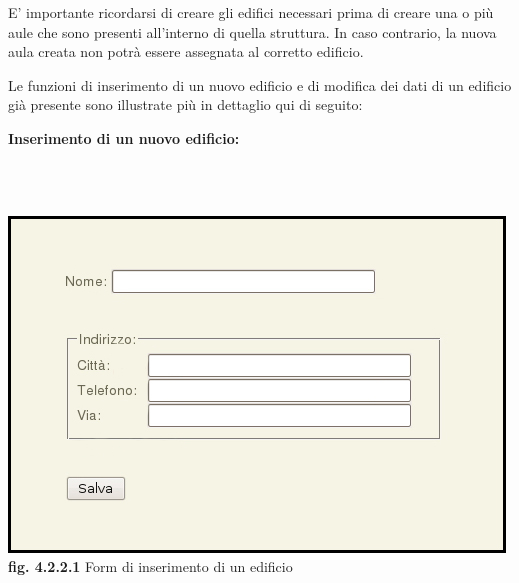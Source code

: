\documentclass[11pt,a4paper]{article}
\begin{document}
E' importante ricordarsi di creare gli edifici necessari prima di creare una o più aule che sono presenti all'interno di quella struttura. In caso contrario, la nuova aula creata non potrà essere assegnata al corretto edificio.

Le funzioni di inserimento di un nuovo edificio e di modifica dei dati di un edificio già presente sono illustrate più in dettaglio qui di seguito:
\newline \newline
\begin{large}\textbf{Inserimento di un nuovo edificio:}\end{large}
\\ \\
\begin{center}
	\includegraphics[scale=0.5]{images/nuovo_edificio.jpg}\\
	\textbf{fig. 4.2.2.1} Form di inserimento di un edificio\\
\end{center}
\bigskip
\end{document}
